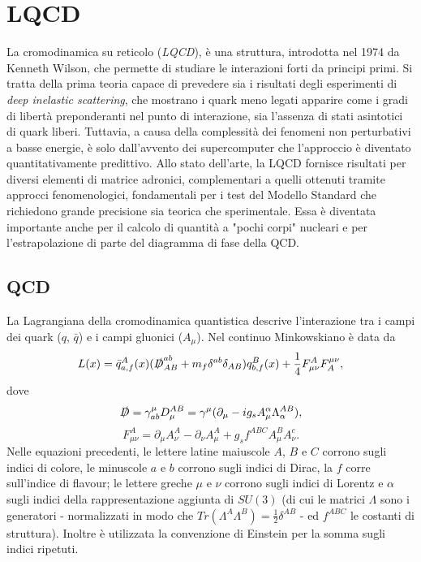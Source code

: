 \documentclass[LaM]{sapthesis}
\begin{document}
	\chapter{LQCD}
	La cromodinamica su reticolo (\emph{LQCD}), è una struttura, introdotta nel 1974 da Kenneth Wilson, che permette di studiare le interazioni forti da principi primi. Si tratta della prima teoria capace di prevedere sia i risultati degli esperimenti di \emph{deep inelastic scattering}, che mostrano i quark meno legati apparire come i gradi di libertà preponderanti nel punto di interazione, sia l'assenza di stati asintotici di quark liberi. Tuttavia, a causa della complessità dei fenomeni non perturbativi a basse energie, è solo dall'avvento dei supercomputer che l'approccio è diventato quantitativamente predittivo. Allo stato dell'arte, la LQCD fornisce risultati per diversi elementi di matrice adronici, complementari a quelli ottenuti tramite approcci fenomenologici, fondamentali per i test del Modello Standard che richiedono grande precisione sia teorica che sperimentale. Essa è diventata importante anche per il calcolo di quantità a "pochi corpi" nucleari e per l'estrapolazione di parte del diagramma di fase della QCD.
	
	\section{QCD}
	La Lagrangiana della cromodinamica quantistica descrive l'interazione tra i campi dei quark ($q$, $\bar{q}$) e i campi gluonici ($A_\mu$). Nel continuo Minkowskiano è data da
	\begin{equation}
		L(x)=\bar{q}^A_{a,f}(x)(\slashed{D}_{AB}^{ab}+m_f\delta^{ab}\delta_{AB})q^B_{b,f}(x)+\frac{1}{4}F_{\mu\nu}^AF^{\mu\nu}_A,
	\end{equation}
	dove
	\begin{equation}
		\slashed{D}=\gamma^\mu_{ab}D^{AB}_\mu=\gamma^\mu(\partial_\mu-ig_sA_\mu^\alpha\Lambda^{AB}_\alpha),
	\end{equation}
	\begin{equation}
		F_{\mu\nu}^A=\partial_\mu A^A_\nu-\partial_\nu A^A_\mu+g_sf^{ABC}A^B_\mu A^c_\nu.
	\end{equation}
	Nelle equazioni precedenti, le lettere latine maiuscole $A$, $B$ e $C$ corrono sugli indici di colore, le minuscole $a$ e $b$ corrono sugli indici di Dirac, la $f$ corre sull'indice di flavour; le lettere greche $\mu$ e $\nu$ corrono sugli indici di Lorentz e $\alpha$ sugli indici della rappresentazione aggiunta di $SU(3)$ (di cui le matrici $\Lambda$ sono i generatori - normalizzati in modo che $Tr(\Lambda^A\Lambda^B)=\frac{1}{2}\delta^{AB}$ - ed $f^{ABC}$ le costanti di struttura). Inoltre è utilizzata la convenzione di Einstein per la somma sugli indici ripetuti. 
	
\end{document}
